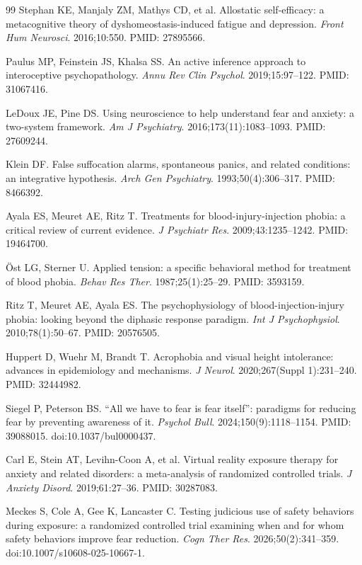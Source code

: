 \documentclass[9pt,twocolumn]{article}
\begin{document}
\begin{thebibliography}{99}
Stephan KE, Manjaly ZM, Mathys CD, et al. Allostatic self-efficacy: a metacognitive theory of dyshomeostasis-induced fatigue and depression. \emph{Front Hum Neurosci}. 2016;10:550. PMID: 27895566.

Paulus MP, Feinstein JS, Khalsa SS. An active inference approach to interoceptive psychopathology. \emph{Annu Rev Clin Psychol}. 2019;15:97--122. PMID: 31067416.

LeDoux JE, Pine DS. Using neuroscience to help understand fear and anxiety: a two-system framework. \emph{Am J Psychiatry}. 2016;173(11):1083--1093. PMID: 27609244.

Klein DF. False suffocation alarms, spontaneous panics, and related conditions: an integrative hypothesis. \emph{Arch Gen Psychiatry}. 1993;50(4):306--317. PMID: 8466392.

Ayala ES, Meuret AE, Ritz T. Treatments for blood-injury-injection phobia: a critical review of current evidence. \emph{J Psychiatr Res}. 2009;43:1235--1242. PMID: 19464700.

\"Ost LG, Sterner U. Applied tension: a specific behavioral method for treatment of blood phobia. \emph{Behav Res Ther}. 1987;25(1):25--29. PMID: 3593159.

Ritz T, Meuret AE, Ayala ES. The psychophysiology of blood-injection-injury phobia: looking beyond the diphasic response paradigm. \emph{Int J Psychophysiol}. 2010;78(1):50--67. PMID: 20576505.

Huppert D, Wuehr M, Brandt T. Acrophobia and visual height intolerance: advances in epidemiology and mechanisms. \emph{J Neurol}. 2020;267(Suppl 1):231--240. PMID: 32444982.

Siegel P, Peterson BS. ``All we have to fear is fear itself'': paradigms for reducing fear by preventing awareness of it. \emph{Psychol Bull}. 2024;150(9):1118--1154. PMID: 39088015. doi:10.1037/bul0000437.

Carl E, Stein AT, Levihn-Coon A, et al. Virtual reality exposure therapy for anxiety and related disorders: a meta-analysis of randomized controlled trials. \emph{J Anxiety Disord}. 2019;61:27--36. PMID: 30287083.

Meckes S, Cole A, Gee K, Lancaster C. Testing judicious use of safety behaviors during exposure: a randomized controlled trial examining when and for whom safety behaviors improve fear reduction. \emph{Cogn Ther Res}. 2026;50(2):341--359. doi:10.1007/s10608-025-10667-1.


\end{thebibliography}
\end{document}
